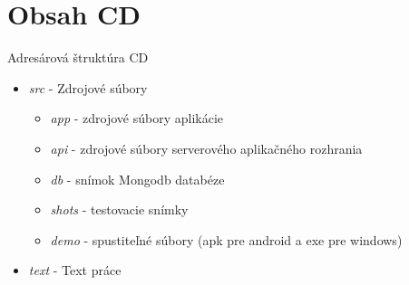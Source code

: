 \chapter{Obsah CD}
\label{pr:cd}
Adresárová štruktúra CD
\begin{itemize}
\item \textit{src} - Zdrojové súbory
    \begin{itemize}
    \item \textit{app} - zdrojové súbory aplikácie
    \item \textit{api} - zdrojové súbory serverového aplikačného rozhrania
    \item \textit{db} - snímok Mongodb databéze
    \item \textit{shots} - testovacie snímky
    \item \textit{demo} - spustiteľné súbory (apk pre android a exe pre windows)
    \end{itemize}
\item \textit{text} - Text práce
\end{itemize}
